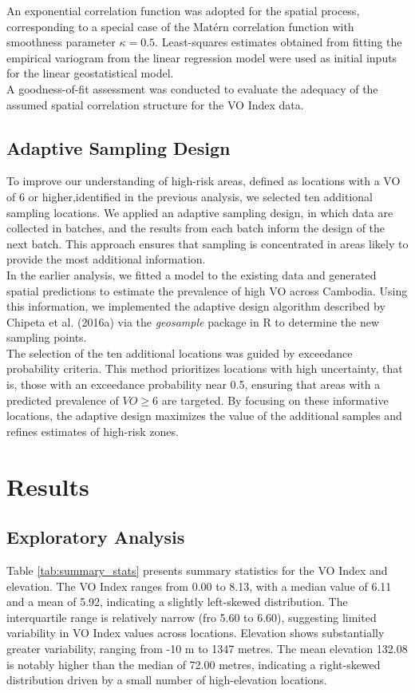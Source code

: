 \documentclass[12pt]{article}
\begin{document}
\noindent An exponential correlation function was adopted for the spatial process, corresponding to a special case of the Matérn correlation function with smoothness parameter $\kappa = 0.5$. Least-squares estimates obtained from fitting the empirical variogram from the linear regression model were used as initial inputs for the linear geostatistical model.\\

\noindent A goodness-of-fit assessment was conducted to evaluate the adequacy of the assumed spatial correlation structure for the VO Index data.

\subsection{Adaptive Sampling Design}
To improve our understanding of high-risk areas, defined as locations with a VO of 6 or higher,identified in the previous analysis, we selected ten additional sampling locations. We applied an adaptive sampling design, in which data are collected in batches, and the results from each batch inform the design of the next batch. This approach ensures that sampling is concentrated in areas likely to provide the most additional information.\\

\noindent In the earlier analysis, we fitted a model to the existing data and generated spatial predictions to estimate the prevalence of high VO across Cambodia. Using this information, we implemented the adaptive design algorithm described by Chipeta et al. (2016a) via the \textit{geosample} package in R to determine the new sampling points.\\

\noindent The selection of the ten additional locations was guided by exceedance probability criteria. This method prioritizes locations with high uncertainty, that is, those with an exceedance probability near 0.5, ensuring that areas with a predicted prevalence of $VO \geq 6$ are targeted. By focusing on these informative locations, the adaptive design maximizes the value of the additional samples and refines estimates of high-risk zones.

\section{Results}
\subsection{Exploratory Analysis}
Table \ref{tab:summary_stats} presents summary statistics for the VO Index and elevation. The VO Index ranges from 0.00 to 8.13, with a median value of 6.11 and a mean of 5.92, indicating a slightly left-skewed distribution. The interquartile range is relatively narrow (fro 5.60 to 6.60), suggesting limited variability in VO Index values across locations. Elevation shows substantially greater variability, ranging from -10 m to 1347 metres. The mean elevation 132.08 is notably higher than the median of 72.00 metres, indicating a right-skewed distribution driven by a small number of high-elevation locations.
\end{document}
